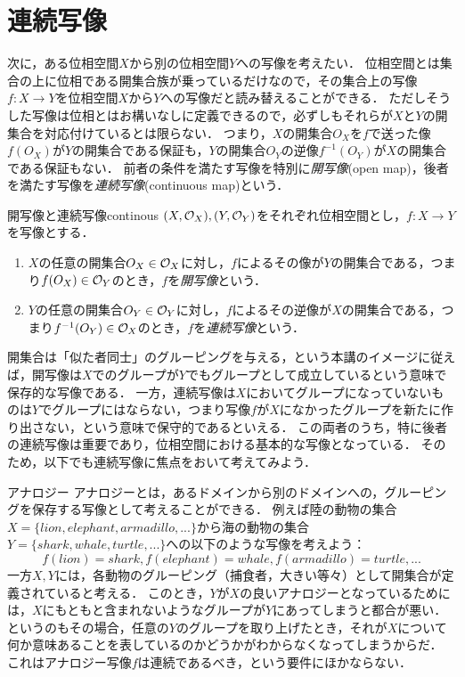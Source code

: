 \documentclass[11pt,a4paper, dvipdfmx]{jsarticle}
\begin{document}
\section{連続写像}
次に，ある位相空間$X$から別の位相空間$Y$への写像を考えたい．
位相空間とは集合の上に位相である開集合族が乗っているだけなので，その集合上の写像$f:X \to Y$を位相空間$X$から$Y$への写像だと読み替えることができる．
ただしそうした写像は位相とはお構いなしに定義できるので，必ずしもそれらが$X$と$Y$の開集合を対応付けているとは限らない．
つまり，$X$の開集合$O_X$を$f$で送った像$f(O_X)$が$Y$の開集合である保証も，$Y$の開集合$O_Y$の逆像$f^{-1}(O_Y)$が$X$の開集合である保証もない．
前者の条件を満たす写像を特別に\emph{開写像}(open map)，後者を満たす写像を\emph{連続写像}(continuous map)という．

\begin{dfn}{開写像と連続写像}{continous}
  $(X, \mathcal{O}_X), (Y, \mathcal{O}_Y)$をそれぞれ位相空間とし，$f:X \to Y$を写像とする．
  \begin{enumerate}
    \item $X$の任意の開集合$O_X \in \mathcal{O}_X$に対し，$f$によるその像が$Y$の開集合である，つまり$f(O_X) \in \mathcal{O}_Y$のとき，$f$を\emph{開写像}という．
    \item $Y$の任意の開集合$O_Y \in \mathcal{O}_Y$に対し，$f$によるその逆像が$X$の開集合である，つまり$f^{-1}(O_Y) \in \mathcal{O}_X$のとき，$f$を\emph{連続写像}という．
  \end{enumerate}  
\end{dfn}
  

開集合は「似た者同士」のグルーピングを与える，という本講のイメージに従えば，開写像は$X$でのグループが$Y$でもグループとして成立しているという意味で保存的な写像である．
一方，連続写像は$X$においてグループになっていないものは$Y$でグループにはならない，つまり写像$f$が$X$になかったグループを新たに作り出さない，という意味で保守的であるといえる．
この両者のうち，特に後者の連続写像は重要であり，位相空間における基本的な写像となっている．
そのため，以下でも連続写像に焦点をおいて考えてみよう．

\begin{rei}{アナロジー}{}
アナロジーとは，あるドメインから別のドメインへの，グルーピングを保存する写像として考えることができる．
例えば陸の動物の集合$X = \{lion, elephant, armadillo,...\}$から海の動物の集合$Y = \{shark, whale, turtle,...\}$への以下のような写像を考えよう：
\[
 f (lion) = shark, f(elephant)=whale, f(armadillo) = turtle,...
\]
一方$X, Y$には，各動物のグルーピング（捕食者，大きい等々）として開集合が定義されていると考える．
このとき，$Y$が$X$の良いアナロジーとなっているためには，$X$にもともと含まれないようなグループが$Y$にあってしまうと都合が悪い．
というのもその場合，任意の$Y$のグループを取り上げたとき，それが$X$について何か意味あることを表しているのかどうかがわからなくなってしまうからだ．
これはアナロジー写像$f$は連続であるべき，という要件にほかならない．
\end{rei}
\end{document}
